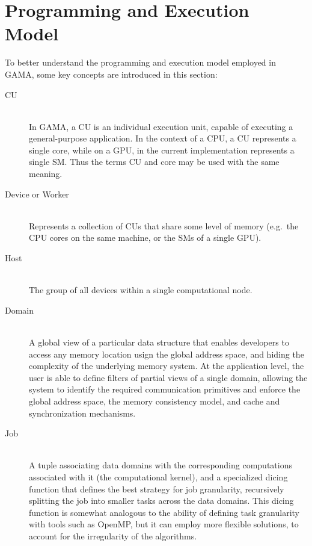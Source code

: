 \documentclass[main.tex]{subfiles}
\begin{document}
\section{Programming and Execution Model}

To better understand the programming and execution model employed in \ac{GAMA}, some key concepts are introduced in this section:

\begin{description}
  \item[\acf{CU}] \hfill \\
    In \ac{GAMA}, a \acl{CU} is an individual execution unit, capable of executing a general-purpose application. In the context of a \ac{CPU}, a \acl{CU} represents a single core, while on a \ac{GPU}, in the current implementation represents a single \acf{SM}. Thus the terms \ac{CU} and core may be used with the same meaning.

  \item[Device or Worker] \hfill \\
    Represents a collection of \aclp{CU} that share some level of memory (e.g.\ the CPU cores on the same machine, or the \acp{SM}  of a single \ac{GPU}).

  \item[Host] \hfill \\
    The group of all devices within a single computational node.

  \item[Domain] \hfill \\
    A global view of a particular data structure that enables developers to access any memory location usign the global address space, and hiding the complexity of the underlying memory system. At the application level, the user is able to define filters of partial views of a single domain, allowing the system to identify the required communication primitives and enforce the global address space, the memory consistency model, and cache and synchronization mechanisms.

  \item[Job] \hfill \\
    A tuple associating data domains with the corresponding computations associated with it (the computational kernel), and a specialized dicing function that defines the best strategy for job granularity, recursively splitting the job into smaller tasks across the data domains. This dicing function is somewhat analogous to the ability of defining task granularity with tools such as \acs{OpenMP}, but it can employ more flexible solutions, to account for the irregularity of the algorithms.


\end{description}
\end{document}
